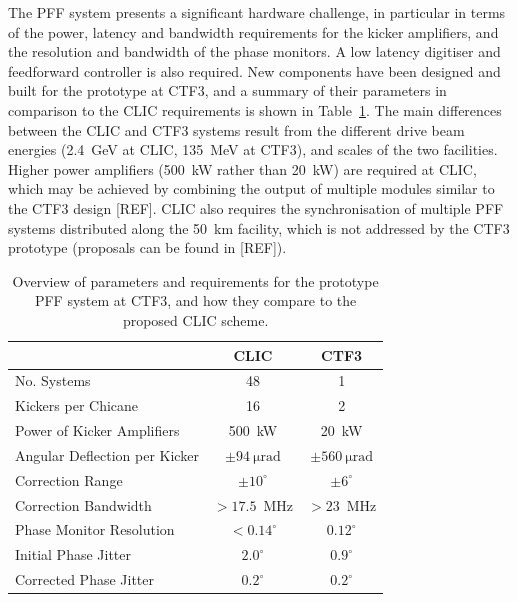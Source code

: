 \documentclass[%
 reprint,
superscriptaddress,
 amsmath,amssymb,
 prl,
]{revtex4-1}
\begin{document}
The PFF system presents a significant hardware challenge, in particular in 
terms of the power, latency and bandwidth requirements for the kicker 
amplifiers, and the resolution and bandwidth of the phase monitors. A low 
latency digitiser and feedforward controller is also required. New 
components have been designed and built for the prototype at CTF3, and a 
summary of their parameters in comparison to the CLIC requirements is shown in 
Table~\ref{tab:pffspecs}. 
The main differences between the CLIC and CTF3 systems result from the 
different drive beam energies (2.4~GeV at CLIC, 135~MeV at CTF3), and scales of 
the two facilities. Higher power amplifiers (500~kW rather than 20~kW) are 
required at CLIC, which may be achieved by combining the output of multiple 
modules similar to the CTF3 design [REF]. CLIC also requires the 
synchronisation of multiple PFF systems distributed along the 50~km facility, 
which is not addressed by the CTF3 prototype (proposals can be found in [REF]).

\begin{table}
	\caption{\label{tab:pffspecs}
	    Overview of parameters and requirements for the prototype PFF system at 
	    CTF3, and how they compare to the proposed CLIC scheme.}
\begin{ruledtabular}
	\begin{tabular}{lcc}
		 & CLIC & CTF3 \\
		\hline
		No. Systems & 48 & 1 \\
		Kickers per Chicane & 16 & 2 \\
		Power of Kicker Amplifiers & 500~kW & 20~kW \\
		Angular Deflection per Kicker & \(\pm94~\mathrm{\mu rad}\) & 
		\(\pm560~\mathrm{\mu rad}\) \\
		Correction Range & \(\pm 10^\circ\) & \(\pm 6^\circ\) \\
		Correction Bandwidth & \(>17.5\)~MHz & \(>23\)~MHz \\
		Phase Monitor Resolution & \(< 0.14^\circ\) & \(0.12^\circ\)  \\
		Initial Phase Jitter & \(2.0^\circ\) & \(0.9^\circ\) \\
		Corrected Phase Jitter & \(0.2^\circ\) & \(0.2^\circ\) \\
	\end{tabular}
\end{ruledtabular}
\end{table}


\end{document}
